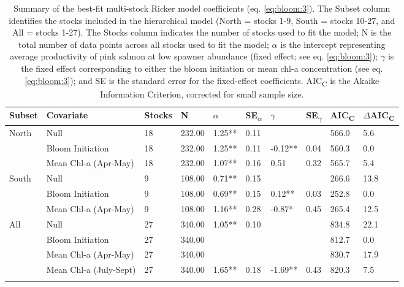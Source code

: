 {\small
\begin{longtable}{llllllllll}
\caption{Summary of the best-fit multi-stock Ricker model coefficients (eq.
\ref{eq:bloom:3}). The Subset column identifies the stocks included in the
hierarchical model (North = stocks 1-9, South = stocks 10-27, and All = stocks
1-27). The Stocks column indicates the number of stocks used
to fit the model; N is the total number of data points across all stocks used to
fit the model; $\alpha$ is the intercept representing average productivity of
pink salmon at low spawner abundance (fixed effect; see eq. \ref{eq:bloom:3});
$\gamma$ is the fixed effect corresponding to either the bloom initiation or
mean chl-a concentration (see eq. \ref{eq:bloom:3}); and SE is the standard
error for the fixed-effect coefficients.  AIC\textsubscript{C} is the Akaike
Information Criterion, corrected for small sample size.} \\ 
  \hline
Subset & Covariate & Stocks & N & $\alpha$ & SE\textsubscript{$\alpha$} & $\gamma$ & SE\textsubscript{$\gamma$} & AIC\textsubscript{C} & $\Delta$AIC\textsubscript{C} \\ 
  \hline
North & Null & 18 & 232.00 & 1.25** & 0.11 &  &  & 566.0 & 5.6 \\ 
   & Bloom Initiation & 18 & 232.00 & 1.25** & 0.11 & -0.12** & 0.04 & 560.3 & 0.0 \\ 
   & Mean Chl-a (Apr-May) & 18 & 232.00 & 1.07** & 0.16 & 0.51 & 0.32 & 565.7 & 5.4 \\ 
  South & Null & 9 & 108.00 & 0.71** & 0.15 &  &  & 266.6 & 13.8 \\ 
   & Bloom Initiation & 9 & 108.00 & 0.69** & 0.15 & 0.12** & 0.03 & 252.8 & 0.0 \\ 
   & Mean Chl-a (Apr-May) & 9 & 108.00 & 1.16** & 0.28 & -0.87* & 0.45 & 265.4 & 12.5 \\ 
  All & Null & 27 & 340.00 & 1.05** & 0.10 &  &  & 834.8 & 22.1 \\ 
   & Bloom Initiation & 27 & 340.00 &  &  &  &  & 812.7 & 0.0 \\ 
   & Mean Chl-a (Apr-May) & 27 & 340.00 &  &  &  &  & 830.7 & 17.9 \\ 
   & Mean Chl-a (July-Sept) & 27 & 340.00 & 1.65** & 0.18 & -1.69** & 0.43 & 820.3 & 7.5 \\ 
  \hline
\label{tab:bloom:2}
\end{longtable}
}
